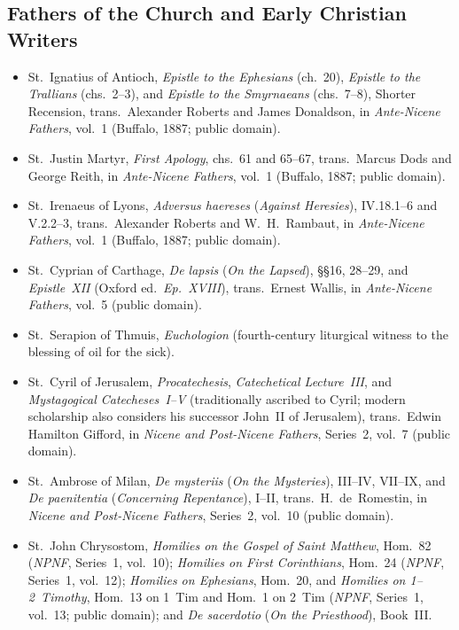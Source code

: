 \subsection{Fathers of the Church and Early Christian Writers}
\begin{itemize}
\item St.~Ignatius of Antioch, \emph{Epistle to the Ephesians} (ch.~20), \emph{Epistle to the Trallians} (chs.~2--3), and \emph{Epistle to the Smyrnaeans} (chs.~7--8), Shorter Recension, trans.\ Alexander Roberts and James Donaldson, in \emph{Ante-Nicene Fathers}, vol.~1 (Buffalo, 1887; public domain).
\item St.~Justin Martyr, \emph{First Apology}, chs.~61 and 65--67, trans.\ Marcus Dods and George Reith, in \emph{Ante-Nicene Fathers}, vol.~1 (Buffalo, 1887; public domain).
\item St.~Irenaeus of Lyons, \emph{Adversus haereses} (\emph{Against Heresies}), IV.18.1--6 and V.2.2--3, trans.\ Alexander Roberts and W.~H.~Rambaut, in \emph{Ante-Nicene Fathers}, vol.~1 (Buffalo, 1887; public domain).
\item St.~Cyprian of Carthage, \emph{De lapsis} (\emph{On the Lapsed}), \S\S16, 28--29, and \emph{Epistle~XII} (Oxford ed.~\emph{Ep.~XVIII}), trans.\ Ernest Wallis, in \emph{Ante-Nicene Fathers}, vol.~5 (public domain).
\item St.~Serapion of Thmuis, \emph{Euchologion} (fourth-century liturgical witness to the blessing of oil for the sick).
\item St.~Cyril of Jerusalem, \emph{Procatechesis}, \emph{Catechetical Lecture~III}, and \emph{Mystagogical Catecheses~I--V} (traditionally ascribed to Cyril; modern scholarship also considers his successor John~II of Jerusalem), trans.\ Edwin Hamilton Gifford, in \emph{Nicene and Post-Nicene Fathers}, Series~2, vol.~7 (public domain).
\item St.~Ambrose of Milan, \emph{De mysteriis} (\emph{On the Mysteries}), III--IV, VII--IX, and \emph{De paenitentia} (\emph{Concerning Repentance}), I--II, trans.\ H.~de~Romestin, in \emph{Nicene and Post-Nicene Fathers}, Series~2, vol.~10 (public domain).
\item St.~John Chrysostom, \emph{Homilies on the Gospel of Saint Matthew}, Hom.~82 (\emph{NPNF}, Series~1, vol.~10); \emph{Homilies on First Corinthians}, Hom.~24 (\emph{NPNF}, Series~1, vol.~12); \emph{Homilies on Ephesians}, Hom.~20, and \emph{Homilies on 1--2~Timothy}, Hom.~13 on 1~Tim and Hom.~1 on 2~Tim (\emph{NPNF}, Series~1, vol.~13; public domain); and \emph{De sacerdotio} (\emph{On the Priesthood}), Book~III.

\end{itemize}
